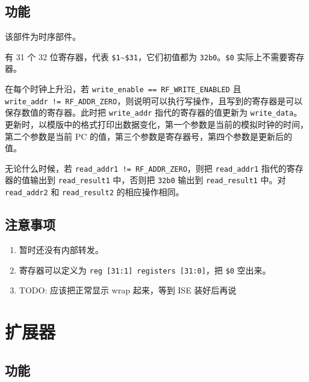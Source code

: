 \documentclass[12pt,AutoFakeBold]{article}
\providecommand{\tightlist}{%
  \setlength{\itemsep}{0pt}\setlength{\parskip}{0pt}}
\begin{document}
\hypertarget{ux529fux80fd-4}{%
\subsection{功能}\label{ux529fux80fd-4}}

该部件为时序部件。

有 31 个 32 位寄存器，代表
\texttt{\$1}\textasciitilde{}\texttt{\$31}，它们初值都为
\texttt{32\textquotesingle{}b0}。\texttt{\$0} 实际上不需要寄存器。

在每个时钟上升沿，若 \texttt{write\_enable\ ==\ RF\_WRITE\_ENABLED} 且
\texttt{write\_addr\ !=\ RF\_ADDR\_ZERO}，则说明可以执行写操作，且写到的寄存器是可以保存数值的寄存器。此时把
\texttt{write\_addr} 指代的寄存器的值更新为
\texttt{write\_data}。更新时，以模版中的格式打印出数据变化，第一个参数是当前的模拟时钟的时间，第二个参数是当前
PC 的值，第三个参数是寄存器号，第四个参数是更新后的值。

无论什么时候，若 \texttt{read\_addr1\ !=\ RF\_ADDR\_ZERO}，则把
\texttt{read\_addr1} 指代的寄存器的值输出到 \texttt{read\_result1}
中，否则把 \texttt{32\textquotesingle{}b0} 输出到 \texttt{read\_result1}
中。对 \texttt{read\_addr2} 和 \texttt{read\_result2} 的相应操作相同。

\hypertarget{ux6ce8ux610fux4e8bux9879-3}{%
\subsection{注意事项}\label{ux6ce8ux610fux4e8bux9879-3}}

\begin{enumerate}
\def\labelenumi{\arabic{enumi}.}
\tightlist
\item
  暂时还没有内部转发。
\item
  寄存器可以定义为 \texttt{reg\ {[}31:1{]}\ registers\ {[}31:0{]}}，把
  \texttt{\$0} 空出来。
\item
  TODO: 应该把正常显示 wrap 起来，等到 ISE 装好后再说
\end{enumerate}

\hypertarget{ux6269ux5c55ux5668}{%
\section{扩展器}\label{ux6269ux5c55ux5668}}

\hypertarget{ux529fux80fd-5}{%
\subsection{功能}\label{ux529fux80fd-5}}
\end{document}
